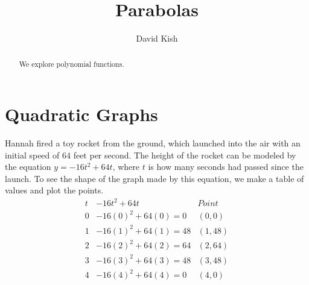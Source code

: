 \documentclass{ximera}
\author{David Kish}
\title{Parabolas}
\begin{document}
\begin{abstract}
We explore polynomial functions.
\end{abstract}
\maketitle

\section{Quadratic Graphs}
\begin{example}
      Hannah fired a toy rocket from the ground,
      which launched into the air with an initial speed of $64$ feet per second.
      The height of the rocket can be modeled by the equation $y=-16t^2+64t$,
      where $t$ is how many seconds had passed since the launch.
      To see the shape of the graph made by this equation,
      we make a table of values and plot the points.\\
$$
\begin{array}{ccc}
                t & -16t^2+64t & Point\\
\hline
                 0 &  -16(0)^2+64(0) =0 & (0,0) \\
        1& -16(1)^2+64(1) =48&(1,48) \\
          2 & -16(2)^2+64(2) =64 &(2,64)\\
3&-16(3)^2+64(3)=48 &(3,48)\\
            4 & -16(4)^2+64(4)=0  &(4,0)
    \end{array}
$$
\begin{image}
\end{image}
\end{example}
\end{document}
